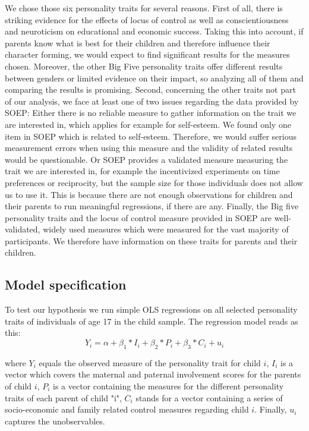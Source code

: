 \documentclass[%
    a4paper,            %
    11pt,               %
    bibliography=totoc, %
]
{scrartcl}
\begin{document}
We chose those six personality traits for several reasons. First of all, there is striking evidence for the effects of locus of control as well as conscientiousness and neuroticism on educational and economic success. Taking this into account, if parents know what is best for their children and therefore influence their character forming, we would expect to find significant results for the measures chosen. Moreover, the other Big Five personality traits offer different results between genders or limited evidence on their impact, so analyzing all of them and comparing the results is promising. Second, concerning the other traits not part of our analysis, we face at least one of two issues regarding the data provided by SOEP: Either there is no reliable measure to gather information on the trait we are interested in, which applies for example for self-esteem. We found only one item in SOEP which is related to self-esteem. Therefore, we would suffer serious measurement errors when using this measure and the validity of related results would be questionable. Or SOEP provides a validated measure measuring the trait we are interested in, for example the incentivized experiments on time preferences or reciprocity, but the sample size for those individuals does not allow us to use it. This is because there are not enough observations for children and their parents to run meaningful regressions, if there are any. Finally, the Big five personality traits and the locus of control measure provided in SOEP are well-validated, widely used measures which were measured for the vast majority of participants. We therefore have information on these traits for parents and their children.
\subsection{Model specification}
To test our hypothesis we run simple OLS regressions on all selected personality traits of individuals of age 17 in the child sample. The regression model reads as this:
\begin{equation}
Y_i=\alpha +\beta_1*I_i+\beta_2*P_i+\beta_3*C_i+u_i
\end{equation}

where $Y_{i}$ equals the observed measure of the personality trait for child $i$, $I_i$ is a vector which covers the maternal and paternal involvement scores for the parents of child $i$, $P_i$ is a vector containing the measures for the different personality traits of each parent of child "i", $C_i$ stands for a vector containing a series of socio-economic and family related control measures regarding child $i$. Finally, $u_i$ captures the unobservables.
\end{document}
